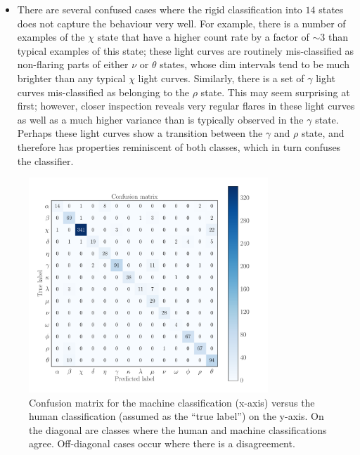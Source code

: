 \documentclass[fleqn,usenatbib]{mnras}
\begin{document}
\begin{itemize}
 \item{There are several confused cases where the rigid classification into $14$ states does not capture the behaviour very well. For example, there is a number of examples of the $\chi$ state that have a higher count rate by a factor of $\sim 3$ than typical examples of this state; these light curves are routinely mis-classified as non-flaring parts of either $\nu$ or $\theta$ states, whose dim intervals tend to be much brighter than any typical $\chi$ light curves. Similarly, there is a set of $\gamma$ light curves mis-classified as belonging to the $\rho$ state. This may seem surprising at first; however, closer inspection reveals very regular flares in these light curves as well as a much higher variance than is typically observed in the $\gamma$ state. Perhaps these light curves show a transition between the $\gamma$ and $\rho$ state, and therefore has properties reminiscent of both classes, which in turn confuses the classifier.}
\end{itemize}

\begin{figure}
\begin{center}
\includegraphics[width=9cm]{grs1915_supervised_cm.pdf}
\caption{Confusion matrix for the machine classification (x-axis) versus the human classification (assumed as the ``true label'') on the 
y-axis. On the diagonal are classes where the human and machine classifications agree. Off-diagonal cases occur where there is a 
disagreement.} 
\label{fig:confusion_matrix}
\end{center}
\end{figure}
\end{document}
